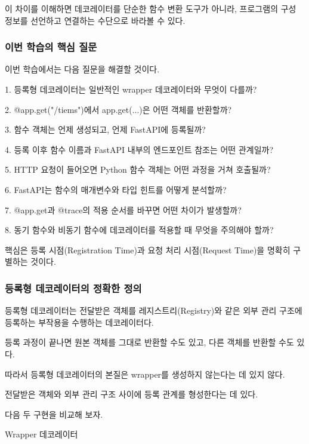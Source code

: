 이 차이를 이해하면 데코레이터를 단순한 함수 변환 도구가 아니라, 프로그램의 구성 정보를 선언하고 연결하는 수단으로 바라볼 수 있다.

\subsubsection{이번 학습의 핵심 질문}

이번 학습에서는 다음 질문을 해결할 것이다.

\begin{dhksmry}
1. 등록형 데코레이터는 일반적인 wrapper 데코레이터와 무엇이 다를까?

2. @app.get("/tiems")에서 app.get(...)은 어떤 객체를 반환할까?

3. 함수 객체는 언제 생성되고, 언제 FastAPI에 등록될까?

4. 등록 이후 함수 이름과 FastAPI 내부의 엔드포인트 참조는 어떤 관계일까?

5. HTTP 요청이 들어오면 Python 함수 객체는 어떤 과정을 거쳐 호출될까?

6. FastAPI는 함수의 매개변수와 타입 힌트를 어떻게 분석할까?

7. @app.get과 @trace의 적용 순서를 바꾸면 어떤 차이가 발생할까?

8. 동기 함수와 비동기 함수에 데코레이터를 적용할 때 무엇을 주의해야 할까?
\end{dhksmry}

핵심은 등록 시점(Registration Time)과 요청 처리 시점(Request Time)을 명확히 구별하는 것이다.

\subsubsection{등록형 데코레이터의 정확한 정의}

등록형 데코레이터는 전달받은 객체를 레지스트리(Registry)와 같은 외부 관리 구조에 등록하는 부작용을 수행하는 데코레이터다.

등록 과정이 끝나면 원본 객체를 그대로 반환할 수도 있고, 다른 객체를 반환할 수도 있다.

따라서 등록형 데코레이터의 본질은 wrapper를 생성하지 않는다는 데 있지 않다.

전달받은 객체와 외부 관리 구조 사이에 등록 관계를 형성한다는 데 있다.

다음 두 구현을 비교해 보자.

\begin{dhknote}
\begin{dhksmry}[centered]
Wrapper 데코레이터
\end{dhksmry}
\end{dhknote}

